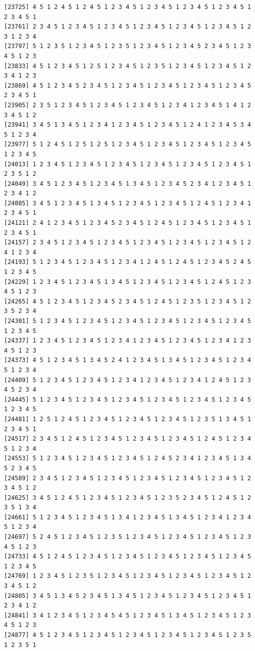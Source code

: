 \documentclass[
  english,
]{book}
\begin{document}
\begin{verbatim}
[23725] 4 5 1 2 4 5 1 2 4 5 1 2 3 4 5 1 2 3 4 5 1 2 3 4 5 1 2 3 4 5 1 2 3 4 5 1
[23761] 2 3 4 5 1 2 3 4 5 1 2 3 4 5 1 2 3 4 5 1 2 3 4 5 1 2 3 4 5 1 2 3 1 2 3 4
[23797] 5 1 2 3 5 1 2 3 4 5 1 2 3 5 1 2 3 4 5 1 2 3 4 5 2 3 4 5 1 2 3 4 5 1 2 3
[23833] 4 5 1 2 3 4 5 1 2 5 1 2 3 4 5 1 2 3 5 1 2 3 4 5 1 2 3 4 5 1 2 3 4 1 2 3
[23869] 4 5 1 2 3 4 5 2 3 4 5 1 2 3 4 5 1 2 3 4 5 1 2 3 4 5 1 2 3 4 5 2 3 4 5 1
[23905] 2 3 5 1 2 3 4 5 1 2 3 4 5 1 2 3 4 5 1 2 3 4 1 2 3 4 5 1 4 1 2 3 4 5 1 2
[23941] 3 4 5 1 3 4 5 1 2 3 4 1 2 3 4 5 1 2 3 4 5 1 2 4 1 2 3 4 5 3 4 5 1 2 3 4
[23977] 5 1 2 4 5 1 2 5 1 2 5 1 2 3 4 5 1 2 3 4 5 1 2 3 4 5 1 2 3 4 5 1 2 3 4 5
[24013] 1 2 3 4 5 1 2 3 4 5 1 2 3 4 5 1 2 3 4 5 1 2 3 4 5 1 2 3 4 5 1 2 3 5 1 2
[24049] 3 4 5 1 2 3 4 5 1 2 3 4 5 1 3 4 5 1 2 3 4 5 2 3 4 1 2 3 4 5 1 2 3 4 1 2
[24085] 3 4 5 1 2 3 4 5 1 3 4 5 1 2 3 4 5 1 2 3 4 5 1 2 4 5 1 2 3 4 1 2 3 4 5 1
[24121] 2 4 1 2 3 4 5 1 2 3 4 5 2 3 4 5 1 2 4 5 1 2 3 4 5 1 2 3 4 5 1 2 3 4 5 1
[24157] 2 3 4 5 1 2 3 4 5 1 2 3 4 5 1 2 3 4 5 1 2 3 4 5 1 2 3 4 5 1 2 4 1 2 3 4
[24193] 5 1 2 3 4 5 1 2 3 4 5 1 2 3 4 1 2 4 5 1 2 4 5 1 2 3 4 5 2 4 5 1 2 3 4 5
[24229] 1 2 3 4 5 1 2 3 4 5 1 3 4 5 1 2 3 4 5 1 2 3 4 5 1 2 4 5 1 2 3 4 5 1 2 3
[24265] 4 5 1 2 3 4 5 1 2 3 4 5 2 3 4 5 1 2 4 5 1 2 3 5 1 2 3 4 5 1 2 3 5 2 3 4
[24301] 5 1 2 3 4 5 1 2 3 4 5 1 2 3 4 5 1 2 3 4 5 1 2 3 4 5 1 2 3 4 5 1 2 3 4 5
[24337] 1 2 3 4 5 1 2 3 4 5 1 2 3 4 1 2 3 4 5 1 2 3 4 5 1 2 3 4 1 2 3 4 5 1 2 3
[24373] 4 5 1 2 3 4 5 1 3 4 5 2 4 1 2 3 4 5 1 3 4 5 1 2 3 4 5 1 2 3 4 5 1 2 3 4
[24409] 5 1 2 3 4 5 1 2 3 4 5 1 2 3 4 1 2 3 4 5 1 2 3 4 1 2 4 5 1 2 3 4 5 2 3 4
[24445] 5 1 2 3 4 5 1 2 3 4 5 1 2 3 4 5 1 2 3 4 5 1 2 3 4 5 1 2 3 4 5 1 2 3 4 5
[24481] 1 2 5 1 2 4 5 1 2 3 4 5 1 2 3 4 5 1 2 3 4 5 1 2 3 5 1 3 4 5 1 2 3 4 5 1
[24517] 2 3 4 5 1 2 4 5 1 2 3 4 5 1 2 3 4 5 1 2 3 4 5 1 2 4 5 1 2 3 4 5 1 2 3 4
[24553] 5 1 2 3 4 5 1 2 3 4 5 1 2 3 4 5 1 2 4 5 2 3 4 1 2 3 4 5 1 3 4 5 2 3 4 5
[24589] 2 3 4 5 1 2 3 4 5 1 2 3 4 5 1 2 3 4 5 1 2 3 4 5 1 2 3 4 5 1 2 3 4 5 1 2
[24625] 3 4 5 1 2 4 5 1 2 3 4 5 1 2 3 4 5 1 2 3 5 2 3 4 5 1 2 4 5 1 2 3 5 1 3 4
[24661] 5 1 2 3 4 5 1 2 3 4 5 1 3 4 1 2 3 4 5 1 3 4 5 1 2 3 4 1 2 3 4 5 1 2 3 4
[24697] 5 2 4 5 1 2 3 4 5 1 2 3 5 1 2 3 4 5 1 2 3 4 5 1 2 3 4 5 1 2 3 4 5 1 2 3
[24733] 4 5 1 2 4 5 1 2 3 4 5 1 2 3 4 5 1 2 3 4 5 1 2 3 4 5 1 2 3 4 5 1 2 3 4 5
[24769] 1 2 3 4 5 1 2 3 5 1 2 3 4 5 1 2 3 4 5 1 2 3 4 5 1 2 3 4 5 1 2 3 4 5 1 2
[24805] 3 4 5 1 3 4 5 2 3 4 5 1 3 4 5 1 2 3 4 5 1 2 3 4 5 1 2 3 4 5 1 2 3 4 1 2
[24841] 3 4 1 2 3 4 5 1 2 3 4 5 4 5 1 2 3 4 5 1 3 4 5 1 2 3 4 5 1 2 3 4 5 1 2 3
[24877] 4 5 1 2 3 4 5 1 2 3 4 5 1 2 3 4 5 1 2 3 4 5 1 2 3 4 5 1 2 3 5 1 2 3 5 1

\end{verbatim}
\end{document}
